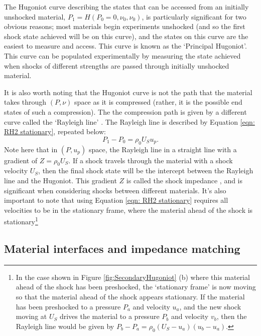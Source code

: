 The Hugoniot curve describing the states that can be accessed from an initially unshocked material, $P_1 = H(P_0 = 0, \nu_0, \nu_0)$, is particularly significant for two obvious reasons; most materials begin experiments unshocked (and so the first shock state achieved will be on this curve), and the states on this curve are the easiest to measure and access. This curve is known as the `Principal Hugoniot'. This curve can be populated experimentally by measuring the state achieved when shocks of different strengths are passed through initially unshocked material.

It is also worth noting that the Hugoniot curve is not the path that the material takes through $(P, \nu)$ space as it is compressed (rather, it is the possible end states of such a compression). The the compression path is given by a different curve called the `Rayleigh line' \cite{Forbes2012}. The Rayleigh line is described by Equation \ref{eqn: RH2 stationary}, repeated below:
\begin{equation} P_1 - P_0 = \rho_0 U_S u_p.  \end{equation}
Note here that in $(P, u_p)$ space, the Rayleigh line in a straight line with a gradient of $Z = \rho_0 U_S$. If a shock travels through the material with a shock velocity $U_S$, then the final shock state will be the intercept between the Rayleigh line and the Hugoniot. This gradient $Z$ is called the shock impedance , and is significant when considering shocks between different materials. It's also important to note that using Equation \ref{eqn: RH2 stationary} requires all velocities to be in the stationary frame, where the material ahead of the shock is stationary\footnote{In the case shown in Figure \ref{fig:SecondaryHugoniot} (b) where this material ahead of the shock has been preshocked, the `stationary frame' is now moving so that the material ahead of the shock appears stationary. If the material has been preshocked to a pressure $P_a$ and velocity $u_a$, and the new shock moving at $U_S$ drives the material to a pressure $P_b$ and velocity $v_b$, then the Rayleigh line would be given by $P_b - P_a = \rho_0 (U_S - u_a) (u_b - u_a).$ }

\subsection{Material interfaces and impedance matching \label{IMTheory}}

